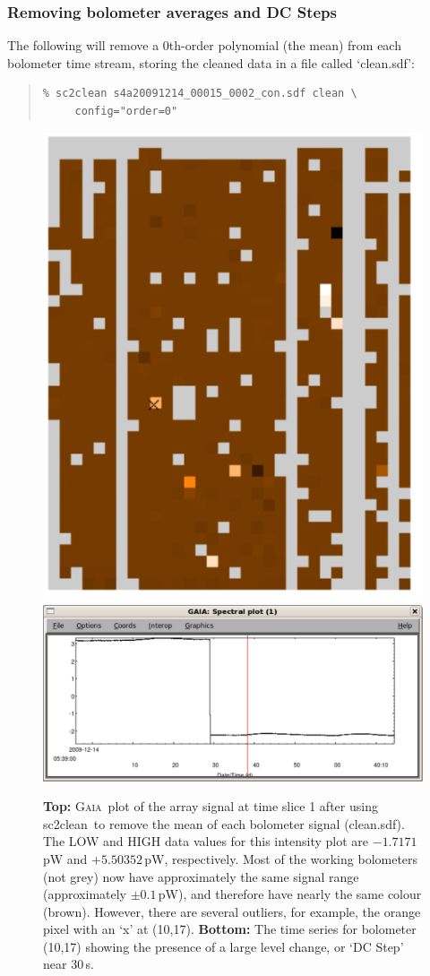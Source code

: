 \documentclass[twoside,11pt]{article}
\newcommand{\xref}[3]{#1}
\newcommand{\xlabel}[1]{}
\renewcommand{\_}{\texttt{\symbol{95}}}
\newenvironment{myquote}{\begin{quote}\begin{small}}{\end{small}\end{quote}}
\newcommand{\gaia}{\xref{\textsc{Gaia}}{sun214}{}}
\newcommand{\task}[1]{\textsf{#1}}
\newcommand{\clean}{\xref{\task{sc2clean}}{sun258}{SC2CLEAN}}
\begin{document}
\subsubsection{\xlabel{clean_average}Removing bolometer averages and DC Steps}

The following will remove a 0th-order polynomial (the mean) from each
bolometer time stream, storing the cleaned data in a file called
`clean.sdf':

\begin{myquote}
\begin{verbatim}
% sc2clean s4a20091214_00015_0002_con.sdf clean \
     config="order=0"
\end{verbatim}
\end{myquote}

\begin{figure}
\begin{center}
\includegraphics[width=0.5\linewidth]{sc19_array_mean}
\includegraphics[width=0.9\linewidth]{sc19_dcstep}
\caption{\textbf{Top:} \gaia\ plot of the array signal at time slice 1
  after using \clean\ to remove the mean of each bolometer signal
  (clean.sdf). The LOW and HIGH data values for this intensity plot
  are $-1.7171$\,pW and $+5.50352$\,pW, respectively. Most of the
  working bolometers (not grey) now have approximately the same signal
  range (approximately $\pm 0.1$\,pW), and therefore have nearly the
  same colour (brown). However, there are several outliers, for
  example, the orange pixel with an `x' at (10,17). \textbf{Bottom:} The
  time series for bolometer (10,17) showing the presence of a large
  level change, or `DC Step' near 30\,s.}
\label{fig:array_mean}
\end{center}
\end{figure}
\end{document}
